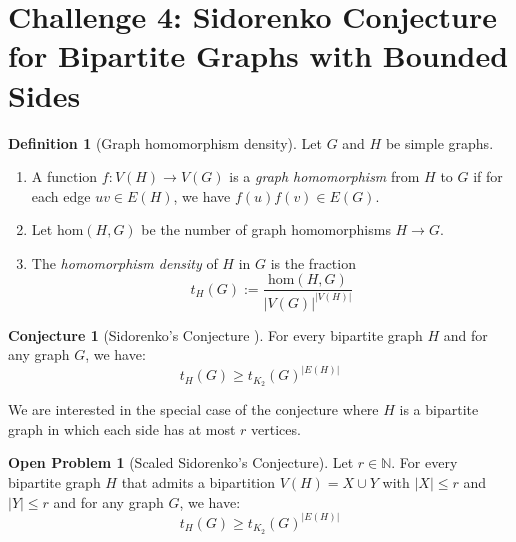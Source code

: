 \documentclass[12pt]{article}
\numberwithin{equation}{section}
\theoremstyle{definition}
\newtheorem{definition}{Definition}
\newtheorem{conjecture}[theorem]{Conjecture}
\newtheorem{openproblem}[theorem]{Open Problem}
\newcommand{\ev}[1]{( #1 )}
\newcommand{\N}{\mathbb{N}}
\begin{document}
\section*{Challenge 4: Sidorenko Conjecture for Bipartite Graphs with Bounded Sides}

\begin{definition}[Graph homomorphism density]
Let $G$ and $H$ be simple graphs. 
\begin{enumerate}
\item A function $f: V\ev{H} \rightarrow V\ev{G}$ is a \textit{graph homomorphism} from $H$ to $G$ if for each edge $uv \in E\ev{H}$, we have $f\ev{u}f\ev{v} \in E\ev{G}$. 

\item Let $\mathrm{hom}\ev{H,G}$ be the number of graph homomorphisms $H \rightarrow G$. 

\item The \textit{homomorphism density} of $H$ in $G$ is the fraction
$$
t_{H}\ev{G} := \dfrac{\mathrm{hom}\ev{H,G}}{|V\ev{G}|^{|V\ev{H}|}}
$$
\end{enumerate}
\end{definition}

\begin{conjecture}[Sidorenko's Conjecture \mbox{\cite{sidorenko}}]
For every bipartite graph $H$ and for any graph $G$, we have:
$$
t_H\ev{G} \geq t_{K_2}\ev{G}^{|E\ev{H}|}
$$
\end{conjecture}

We are interested in the special case of the conjecture where $H$ is a bipartite graph in which each side has at most $r$ vertices.
\begin{openproblem}[Scaled Sidorenko's Conjecture]
Let $r \in \N$. For every bipartite graph $H$ that admits a bipartition $V\ev{H} = X \cup Y$ with $|X| \leq r$ and $|Y| \leq r$ and for any graph $G$, we have:
$$
t_H\ev{G} \geq t_{K_2}\ev{G}^{|E\ev{H}|}
$$
\end{openproblem}

\printbibliography
\end{document}
